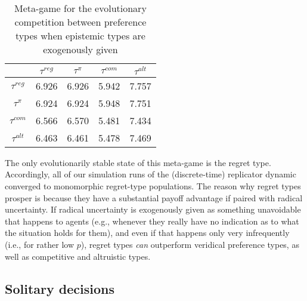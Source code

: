 \documentclass[fleqn,reqno,11pt]{article}
\begin{document}
\begin{table}[]
\centering
\begin{tabular}{ccccc}
  \toprule
  & $\tau^{reg}$ 
  & $\tau^{\pi}$ 
  & $\tau^{com}$
  & $\tau^{alt}$ \\ 
  \midrule
  $\tau^{reg} $ & 6.926 & 6.926 & 5.942 & 7.757 \\ 
  $\tau^{\pi} $ & 6.924 & 6.924 & 5.948 & 7.751 \\ 
  $\tau^{com }$ & 6.566 & 6.570 & 5.481 & 7.434 \\ 
  $\tau^{alt} $ & 6.463 & 6.461 & 5.478 & 7.469 \\ 
   \bottomrule
\end{tabular}
\caption{Meta-game for the evolutionary competition between preference types when epistemic types are exogenously
  given}
\label{tab:ExogeneousEpistemics}
\end{table}

The only evolutionarily stable state of this meta-game is the regret type. Accordingly, all of
our simulation runs of the (discrete-time) replicator dynamic converged to monomorphic
regret-type populations. The reason why regret types prosper is because they have a substantial
payoff advantage if paired with radical uncertainty. If radical uncertainty is exogenously
given as something unavoidable that happens to agents (e.g., whenever they really have no
indication as to what the situation holds for them), and even if that happens only very
infrequently (i.e., for rather low $p$), regret types \emph{can} outperform veridical
preference types, as well as competitive and altruistic types.


\subsection{Solitary decisions}
\label{sec:solitary-decisions}

\end{document}
